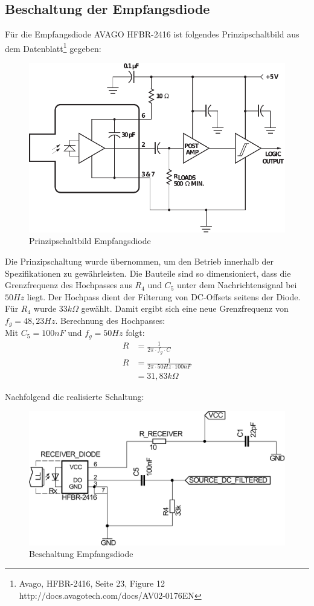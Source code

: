 \subsection{Beschaltung der Empfangsdiode}
\label{subsec:receiver_schematic}
Für die Empfangsdiode \textsc{AVAGO HFBR-2416} ist folgendes Prinzipschaltbild aus dem Datenblatt\footnote{Avago, HFBR-2416, Seite 23, Figure 12 http://docs.avagotech.com/docs/AV02-0176EN} gegeben:
\begin{figure}[H]
	\centering
	\includegraphics[scale=0.65]{gfx/hfbr.pdf}
	\caption{Prinzipschaltbild Empfangsdiode}
	\label{fig:basic_schematic} 
\end{figure}
\newpage
Die Prinzipschaltung wurde übernommen, um den Betrieb innerhalb der Spezifikationen zu gewährleisten. Die Bauteile sind so dimensioniert, dass die Grenzfrequenz des Hochpasses aus $R_4$ und $C_5$ unter dem Nachrichtensignal bei $50Hz$ liegt. Der Hochpass dient der Filterung von DC-Offsets seitens der Diode. \\
Für $R_4$ wurde $33k\Omega$ gewählt. Damit ergibt sich eine neue Grenzfrequenz von $ f_{g}=48,23Hz $.
Berechnung des Hochpasses: \\ 
Mit $C_5 = 100nF$ und $f_g=50Hz$  folgt:
\savebox\strutbox{$\vphantom{\dfrac11}$}
\begin{align}
		R &= \frac{1}{2 \pi \cdot f_g \cdot C}\\
		R &= \frac{1}{2 \pi \cdot 50 Hz \cdot 100nF}\\
		  &= 31,83k\Omega		 	
\end{align} 
\noindent


Nachfolgend die realisierte Schaltung:
\begin{figure}[htbp]
\centering
 \includegraphics[scale=0.50]{gfx/receiver_part.pdf}
	\caption{Beschaltung Empfangsdiode}
\end{figure}
 
 

